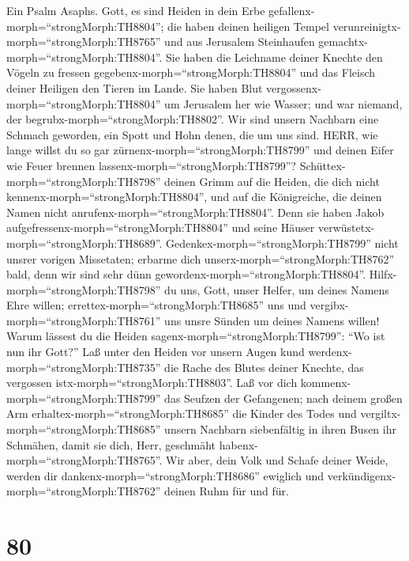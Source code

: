  Ein Psalm Asaphs. Gott, es sind Heiden in dein Erbe
gefallenx-morph=``strongMorph:TH8804''; die haben deinen heiligen Tempel
verunreinigtx-morph=``strongMorph:TH8765'' und aus Jerusalem Steinhaufen
gemachtx-morph=``strongMorph:TH8804''.  Sie haben die
Leichname deiner Knechte den Vögeln zu fressen
gegebenx-morph=``strongMorph:TH8804'' und das Fleisch deiner Heiligen
den Tieren im Lande.  Sie haben Blut
vergossenx-morph=``strongMorph:TH8804'' um Jerusalem her wie Wasser; und
war niemand, der begrubx-morph=``strongMorph:TH8802''.  Wir
sind unsern Nachbarn eine Schmach geworden, ein Spott und Hohn denen,
die um uns sind.  HERR, wie lange willst du so gar
zürnenx-morph=``strongMorph:TH8799'' und deinen Eifer wie Feuer brennen
lassenx-morph=``strongMorph:TH8799''? 
Schüttex-morph=``strongMorph:TH8798'' deinen Grimm auf die Heiden, die
dich nicht kennenx-morph=``strongMorph:TH8804'', und auf die
Königreiche, die deinen Namen nicht
anrufenx-morph=``strongMorph:TH8804''.  Denn sie haben Jakob
aufgefressenx-morph=``strongMorph:TH8804'' und seine Häuser
verwüstetx-morph=``strongMorph:TH8689''. 
Gedenkex-morph=``strongMorph:TH8799'' nicht unsrer vorigen Missetaten;
erbarme dich unserx-morph=``strongMorph:TH8762'' bald, denn wir sind
sehr dünn gewordenx-morph=``strongMorph:TH8804''. 
Hilfx-morph=``strongMorph:TH8798'' du uns, Gott, unser Helfer, um deines
Namens Ehre willen; errettex-morph=``strongMorph:TH8685'' uns und
vergibx-morph=``strongMorph:TH8761'' uns unsre Sünden um deines Namens
willen!  Warum lässest du die Heiden
sagenx-morph=``strongMorph:TH8799'': ``Wo ist nun ihr Gott?'' Laß unter
den Heiden vor unsern Augen kund werdenx-morph=``strongMorph:TH8735''
die Rache des Blutes deiner Knechte, das vergossen
istx-morph=``strongMorph:TH8803''.  Laß vor dich
kommenx-morph=``strongMorph:TH8799'' das Seufzen der Gefangenen; nach
deinem großen Arm erhaltex-morph=``strongMorph:TH8685'' die Kinder des
Todes  und vergiltx-morph=``strongMorph:TH8685'' unsern
Nachbarn siebenfältig in ihren Busen ihr Schmähen, damit sie dich, Herr,
geschmäht habenx-morph=``strongMorph:TH8765''.  Wir aber,
dein Volk und Schafe deiner Weide, werden dir
dankenx-morph=``strongMorph:TH8686'' ewiglich und
verkündigenx-morph=``strongMorph:TH8762'' deinen Ruhm für und für.

\hypertarget{section-79}{%
\section{80}\label{section-79}}

